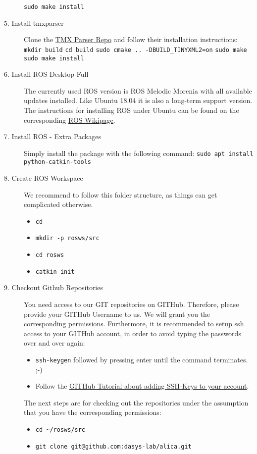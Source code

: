 \begin{description}
\verb#sudo make install#\\
	\item[5. Install tmxparser] Clone the \href{git@github.com:dasys-lab/tmxparser.git}{TMX Parser Repo} and follow their installation instructions:\\
\verb#mkdir build#
\verb#cd build#
\verb#sudo cmake .. -DBUILD_TINYXML2=on#
\verb#sudo make#
\verb#sudo make install#
	\item[6. Install ROS Desktop Full] The currently used ROS version is ROS Melodic Morenia with all available updates installed. Like Ubuntu 18.04 it is also a long-term support version. The instructions for installing ROS under Ubuntu can be found on the corresponding \href{http://wiki.ros.org/melodic/Installation/Ubuntu}{ROS Wikipage}.
	\item[7. Install ROS - Extra Packages] Simply install the package with the following command: \verb#sudo apt install python-catkin-tools#
	\item[8. Create ROS Workspace] We recommend to follow this folder structure, as things can get complicated otherwise. 
	\begin{itemize}
		\item \verb#cd#
		\item \verb#mkdir -p rosws/src#
		\item \verb#cd rosws#
		\item \verb#catkin init#
	\end{itemize}
	\item[9. Checkout Github Repositories] You need access to our GIT repositories on GITHub. Therefore, please provide your GITHub Username to us. We will grant you the corresponding permissions. Furthermore, it is recommended to setup ssh access to your GITHub account, in order to avoid typing the passwords over and over again:
	\begin{itemize}
		\item \verb#ssh-keygen# followed by pressing enter until the command terminates. ;-)
		\item Follow the \href{https://help.github.com/articles/adding-a-new-ssh-key-to-your-github-account/}{GITHub Tutorial about adding SSH-Keys to your account}.
	\end{itemize}
	The next steps are for checking out the repositories under the assumption that you have the corresponding permissions:
	\begin{itemize}
		\item \verb#cd ~/rosws/src#
		\item \verb#git clone git@github.com:dasys-lab/alica.git#

\end{itemize}
\end{description}
